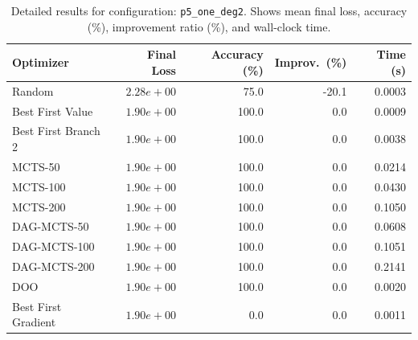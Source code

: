 \begin{table}[H]
\centering
\caption{Detailed results for configuration: \texttt{p5\_one\_deg2}. Shows mean final loss, accuracy (\%), improvement ratio (\%), and wall-clock time.}
\label{tab:funclearn-detail-22}
\begin{tabular}{lrrrr}
\toprule
Optimizer & Final Loss & Accuracy (\%) & Improv.~(\%) & Time (s) \\
\midrule
Random & $2.28e+00$ & 75.0 & -20.1 & 0.0003 \\
\hline
Best First Value & \textbf{$1.90e+00$} & 100.0 & 0.0 & 0.0009 \\
\hline
Best First Branch 2 & \textbf{$1.90e+00$} & 100.0 & 0.0 & 0.0038 \\
\hline
MCTS-50 & \textbf{$1.90e+00$} & 100.0 & 0.0 & 0.0214 \\
\hline
MCTS-100 & \textbf{$1.90e+00$} & 100.0 & 0.0 & 0.0430 \\
\hline
MCTS-200 & \textbf{$1.90e+00$} & 100.0 & 0.0 & 0.1050 \\
\hline
DAG-MCTS-50 & \textbf{$1.90e+00$} & 100.0 & 0.0 & 0.0608 \\
\hline
DAG-MCTS-100 & \textbf{$1.90e+00$} & 100.0 & 0.0 & 0.1051 \\
\hline
DAG-MCTS-200 & \textbf{$1.90e+00$} & 100.0 & 0.0 & 0.2141 \\
\hline
DOO & \textbf{$1.90e+00$} & 100.0 & 0.0 & 0.0020 \\
\hline
Best First Gradient & \textbf{$1.90e+00$} & 0.0 & 0.0 & 0.0011 \\
\bottomrule
\end{tabular}
\end{table}

